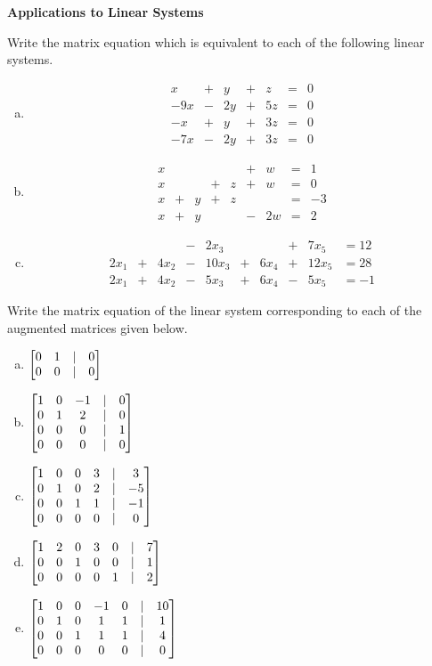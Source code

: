 \centerline{\bf  {Applications to Linear Systems}} 
 \begin{prob} \label{prob14.5} Write the matrix equation which is equivalent to each of the following linear systems.
\medskip
\begin{enumerate}[a)]
\item 
$$\begin{matrix} 
x&+&y&+&z&=&0\\
-9x&-&2y&+&5z&=&0\\
-x&+&y&+&3z&=&0\\
-7x&-&2y&+&3z&=&0 \end{matrix} $$
\medskip
%

\item\sov $$\begin{matrix} x&&&&&+&w&=&1\\
x&&&+&z&+&w&=&0\\
x&+&y&+&z&&&=&-3\\
x&+&y&&&-&2w&=&2 \end{matrix} $$
\medskip
% 
\item 
$$\begin{matrix} &&&-&2x_{3}&&&+&7x_{5}&=12\\
2x_{1}&+&4x_{2}&-&10x_{3}&+&6x_{4}&+&12x_{5}&=28\\
2x_{1}&+&4x_{2}&-&5x_{3}&+&6x_{4}&-&5x_{5}&=-1\end{matrix}$$
\medskip
%
\end{enumerate}
 

\end{prob} \begin{prob} \label{prob14.6}  Write the matrix equation of the linear system corresponding to each of the augmented matrices given below.
\medskip
\begin{enumerate}[a)]

\item $\bmatrix  0 & 1 &|& 0 \\
 0 & 0 &|& 0 \endbmatrix$
\medskip
%
\item\sov $ \bmatrix 1 & 0 & -1 &|&0 \\
 0 & 1 & 2 &|&0\\
 0 & 0 & 0&|&1 \\
 0 & 0 & 0 &|&0\endbmatrix$
\medskip
%
\item $\bmatrix  1 & 0 & 0 & 3 &|& 3 \\
 0 & 1 & 0 & 2 &|& -5 \\
 0 & 0 & 1 & 1 &|& -1 \\
 0 & 0 & 0 & 0 &|& 0\endbmatrix$
\medskip
%
\item\sov $\bmatrix  1 & 2 & 0 & 3 & 0 &|& 7 \\
 0 & 0 & 1 & 0 & 0 &|& 1 \\
 0 & 0 & 0 & 0 & 1 &|& 2 \endbmatrix$
\medskip
%

\item $ \bmatrix 
1& 0& 0& -1& 0&|& 10\\  
0& 1& 0& 1&1&|& 1\\ 
0& 0& 1& 1& 1&|& 4\\ 
0& 0& 0& 0& 0&|& 0\endbmatrix$
\medskip
%
\end{enumerate}

\end{prob} 


